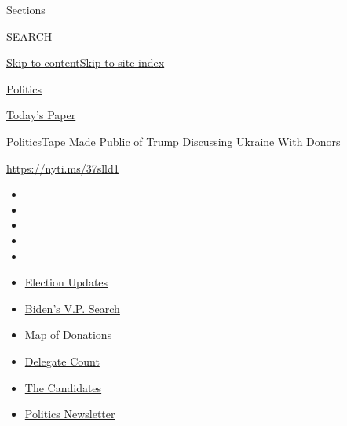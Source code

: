 Sections

SEARCH

\protect\hyperlink{site-content}{Skip to
content}\protect\hyperlink{site-index}{Skip to site index}

\href{https://www.nytimes.com/section/politics}{Politics}

\href{https://myaccount.nytimes.com/auth/login?response_type=cookie\&client_id=vi}{}

\href{https://www.nytimes.com/section/todayspaper}{Today's Paper}

\href{/section/politics}{Politics}\textbar{}Tape Made Public of Trump
Discussing Ukraine With Donors

\url{https://nyti.ms/37slld1}

\begin{itemize}
\item
\item
\item
\item
\item
\end{itemize}

\begin{itemize}
\item
  \href{https://www.nytimes.com/2020/07/31/us/elections/biden-vs-trump.html?action=click\&pgtype=Article\&state=default\&region=TOP_BANNER\&context=storylines_menu}{Election
  Updates}
\item
  \href{https://www.nytimes.com/article/biden-vice-president-2020.html?action=click\&pgtype=Article\&state=default\&region=TOP_BANNER\&context=storylines_menu}{Biden's
  V.P. Search}
\item
  \href{https://www.nytimes.com/interactive/2020/07/24/us/politics/trump-biden-campaign-donors.html?action=click\&pgtype=Article\&state=default\&region=TOP_BANNER\&context=storylines_menu}{Map
  of Donations}
\item
  \href{https://www.nytimes.com/interactive/2020/us/elections/delegate-count-primary-results.html?action=click\&pgtype=Article\&state=default\&region=TOP_BANNER\&context=storylines_menu}{Delegate
  Count}
\item
  \href{https://www.nytimes.com/interactive/2019/us/politics/2020-presidential-candidates.html?action=click\&pgtype=Article\&state=default\&region=TOP_BANNER\&context=storylines_menu}{The
  Candidates}
\item
  \href{https://www.nytimes.com/newsletters/politics?action=click\&pgtype=Article\&state=default\&region=TOP_BANNER\&context=storylines_menu}{Politics
  Newsletter}
\end{itemize}

